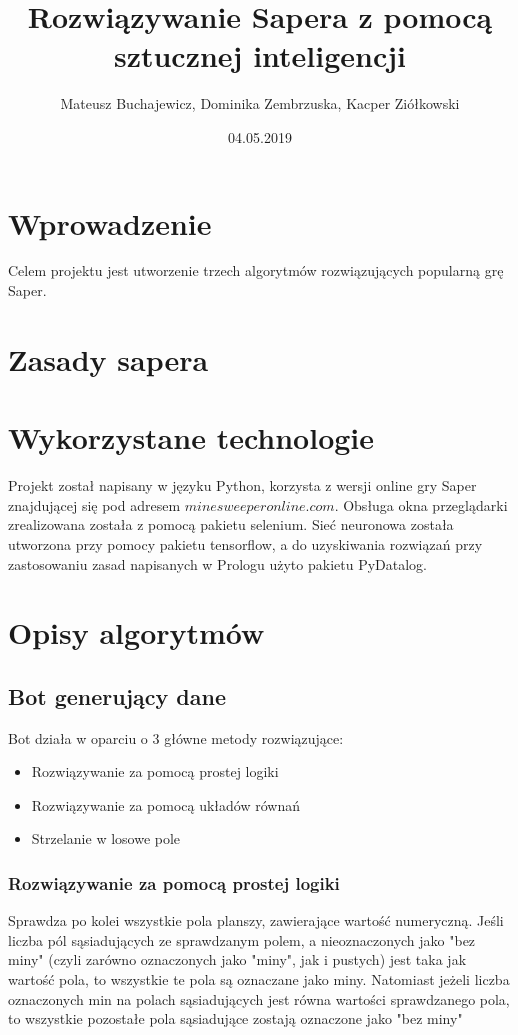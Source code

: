 \documentclass[letterpaper,12pt]{article} %
\title{Rozwiązywanie Sapera z pomocą sztucznej inteligencji}
\date{04.05.2019}
\author{ Mateusz Buchajewicz, Dominika Zembrzuska, Kacper Ziółkowski}
\begin{document}
\maketitle

\section{Wprowadzenie}
Celem projektu jest utworzenie trzech algorytmów rozwiązujących popularną grę Saper.

\section{Zasady sapera}

\section{Wykorzystane technologie}
Projekt został napisany w języku Python, korzysta z wersji online gry Saper znajdującej się pod adresem $minesweeperonline.com$. Obsługa okna przeglądarki zrealizowana 
została z pomocą pakietu selenium. Sieć neuronowa została utworzona przy pomocy pakietu tensorflow, a do uzyskiwania rozwiązań przy zastosowaniu zasad napisanych w Prologu
użyto pakietu PyDatalog.

\section{Opisy algorytmów}
\subsection{Bot generujący dane}

Bot działa w oparciu o 3 główne metody rozwiązujące:
\begin{itemize}
    \item{Rozwiązywanie za pomocą prostej logiki}
    \item{Rozwiązywanie za pomocą układów równań}
    \item{Strzelanie w losowe pole}    
\end{itemize}
\subsubsection*{Rozwiązywanie za pomocą prostej logiki}
Sprawdza po kolei wszystkie pola planszy, zawierające wartość numeryczną. 
Jeśli liczba pól sąsiadujących ze sprawdzanym polem, a nieoznaczonych jako
"bez miny" (czyli zarówno oznaczonych jako "miny", jak i pustych) jest taka
jak wartość pola, to wszystkie te pola są oznaczane jako miny.
Natomiast jeżeli liczba oznaczonych min na polach sąsiadujących jest równa wartości 
sprawdzanego pola, to wszystkie pozostałe pola sąsiadujące zostają oznaczone jako "bez miny"
\newpage
\end{document}
